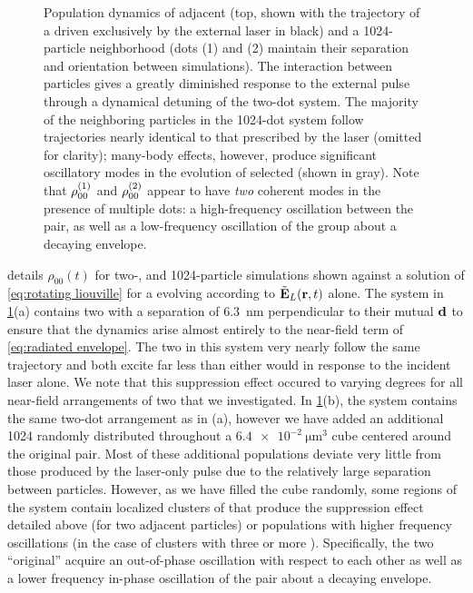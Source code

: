 \begin{figure}
  
  \caption{\label{fig:density stats}Population dynamics of adjacent \qds{} (top, shown with the trajectory of a \qd{} driven exclusively by the external laser in black) and a 1024-particle neighborhood (dots (1) and (2) maintain their separation and orientation between simulations).
    The interaction between particles gives a greatly diminished response to the external pulse through a dynamical detuning of the two-dot system.
    The majority of the neighboring particles in the 1024-dot system follow trajectories nearly identical to that prescribed by the laser (omitted for clarity); many-body effects, however, produce significant oscillatory modes in the evolution of selected \qds{} (shown in gray).
    Note that $\rho_{00}^{\qty(1)}$ and $\rho_{00}^{\qty(2)}$ appear to have \emph{two} coherent modes in the presence of multiple dots: a high-frequency oscillation between the pair, as well as a low-frequency oscillation of the group about a decaying envelope.
}
\end{figure}

 details $\rho_{00}(t)$ for two-, and 1024-particle simulations shown against a solution of \cref{eq:rotating liouville} for a \qd{} evolving according to $\tilde{\vb{E}}_L(\vb{r}, t)$ alone.
The system in \cref{fig:density stats}(a) contains two \qds{} with a separation of \SI{6.3}{\nano\meter} perpendicular to their mutual $\vb{d}$ to ensure that the dynamics arise almost entirely to the near-field term of \cref{eq:radiated envelope}.
The two \qds{} in this system very nearly follow the same trajectory and both excite far less than either would in response to the incident laser alone.
We note that this suppression effect occured to varying degrees for all near-field arrangements of two \qds{} that we investigated.
In \cref{fig:density stats}(b), the system contains the same two-dot arrangement as in (a), however we have added an additional 1024 \qds{} randomly distributed throughout a $\SI{6.4e-2}{\micro\meter\cubed}$ cube centered around the original pair.
Most of these additional \qd{} populations deviate very little from those produced by the laser-only pulse due to the relatively large separation between particles.
However, as we have filled the cube randomly, some regions of the system contain localized clusters of \qds{} that produce the suppression effect detailed above (for two adjacent particles) or populations with higher frequency oscillations (in the case of clusters with three or more \qds{}).
Specifically, the two ``original'' \qds{} acquire an out-of-phase oscillation with respect to each other as well as a lower frequency in-phase oscillation of the pair about a decaying envelope.

